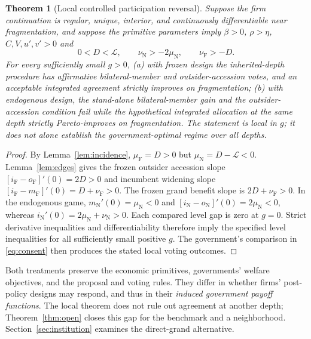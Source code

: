 \documentclass[11pt,a4paper]{article}
\newtheorem{theorem}{Theorem}
\theoremstyle{remark}\newtheorem{remark}[theorem]{Remark}
\newcommand{\N}{\mathrm{N}}\newcommand{\F}{\mathrm{F}}
\newcommand{\loss}{\mathcal L}\newcommand{\vect}[1]{\boldsymbol{#1}}
\begin{document}
\begin{theorem}[Local controlled participation reversal]\label{thm:local}
Suppose the firm continuation is regular, unique, interior, and continuously differentiable near fragmentation, and suppose the primitive parameters imply $\beta>0$, $\rho>\eta$, $C,V,u',v'>0$ and
\begin{equation}\label{eq:conditions}
0<D<\loss,\qquad \nu_{\N}>-2\mu_{\N},\qquad \nu_{\F}>-D.
\end{equation}
For every sufficiently small $g>0$, (a) with frozen design the inherited-depth procedure has affirmative bilateral-member and outsider-accession votes, and an acceptable integrated agreement strictly improves on fragmentation; (b) with endogenous design, the \emph{stand-alone} bilateral-member gain and the outsider-accession condition fail while the hypothetical integrated allocation at the same depth strictly Pareto-improves on fragmentation. The statement is local in $g$; it does not alone establish the government-optimal regime over all depths.
\end{theorem}
\begin{proof}
By Lemma~\ref{lem:incidence}, $\mu_{\F}=D>0$ but $\mu_{\N}=D-\loss<0$. Lemma~\ref{lem:edges} gives the frozen outsider accession slope $[i_{\F}-o_{\F}]'(0)=2D>0$ and incumbent widening slope $[i_{\F}-m_{\F}]'(0)=D+\nu_{\F}>0$. The frozen grand benefit slope is $2D+\nu_{\F}>0$. In the endogenous game, $m_{\N}'(0)=\mu_{\N}<0$ and $[i_{\N}-o_{\N}]'(0)=2\mu_{\N}<0$, whereas $i_{\N}'(0)=2\mu_{\N}+\nu_{\N}>0$. Each compared level gap is zero at $g=0$. Strict derivative inequalities and differentiability therefore imply the specified level inequalities for all sufficiently small positive $g$. The government's comparison in \eqref{eq:consent} then produces the stated local voting outcomes.
\end{proof}

Both treatments preserve the economic primitives, governments' welfare objectives, and the proposal and voting rules. They differ in whether firms' post-policy designs may respond, and thus in their \emph{induced government payoff functions}. The local theorem does not rule out agreement at another depth; Theorem~\ref{thm:open} closes this gap for the benchmark and a neighborhood. Section~\ref{sec:institution} examines the direct-grand alternative.
\end{document}
